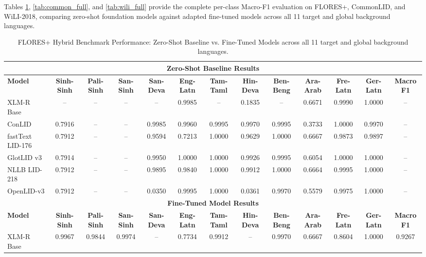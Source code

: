 \documentclass[11pt]{article}
\begin{document}
Tables \ref{tab:flores_full}, \ref{tab:common_full}, and \ref{tab:wili_full} provide the complete per-class Macro-F1 evaluation on FLORES+, CommonLID, and WiLI-2018, comparing zero-shot foundation models against adapted fine-tuned models across all 11 target and global background languages.

\begin{table}[p]
\centering
\scriptsize
\setlength{\tabcolsep}{2.2pt}
\renewcommand{\arraystretch}{0.90}
\caption{FLORES+ Hybrid Benchmark Performance: Zero-Shot Baseline vs. Fine-Tuned Models across all 11 target and global background languages.}
\label{tab:flores_full}
\begin{tabular}{l ccc cccccccc c}
\toprule
\multicolumn{13}{c}{\textbf{Zero-Shot Baseline Results}} \\
\midrule
\textbf{Model} & \textbf{Sinh-Sinh} & \textbf{Pali-Sinh} & \textbf{San-Sinh} & \textbf{San-Deva} & \textbf{Eng-Latn} & \textbf{Tam-Taml} & \textbf{Hin-Deva} & \textbf{Ben-Beng} & \textbf{Ara-Arab} & \textbf{Fre-Latn} & \textbf{Ger-Latn} & \textbf{Macro F1} \\
\midrule
XLM-R Base & -- & -- & -- & -- & 0.9985 & -- & 0.1835 & -- & 0.6671 & 0.9990 & 1.0000 & -- \\
ConLID & 0.7916 & -- & -- & 0.9985 & 0.9960 & 0.9995 & 0.9970 & 0.9995 & 0.3733 & 1.0000 & 0.9970 & -- \\
fastText LID-176 & 0.7912 & -- & -- & 0.9594 & 0.7213 & 1.0000 & 0.9629 & 1.0000 & 0.6667 & 0.9873 & 0.9897 & -- \\
GlotLID v3 & 0.7914 & -- & -- & 0.9950 & 1.0000 & 1.0000 & 0.9926 & 0.9995 & 0.6054 & 1.0000 & 1.0000 & -- \\
NLLB LID-218 & 0.7912 & -- & -- & 0.9895 & 0.9840 & 1.0000 & 0.9912 & 1.0000 & 0.6664 & 0.9995 & 1.0000 & -- \\
OpenLID-v3 & 0.7912 & -- & -- & 0.0350 & 0.9995 & 1.0000 & 0.0361 & 0.9970 & 0.5579 & 0.9975 & 1.0000 & -- \\
\midrule
\multicolumn{13}{c}{\textbf{Fine-Tuned Model Results}} \\
\midrule
\textbf{Model} & \textbf{Sinh-Sinh} & \textbf{Pali-Sinh} & \textbf{San-Sinh} & \textbf{San-Deva} & \textbf{Eng-Latn} & \textbf{Tam-Taml} & \textbf{Hin-Deva} & \textbf{Ben-Beng} & \textbf{Ara-Arab} & \textbf{Fre-Latn} & \textbf{Ger-Latn} & \textbf{Macro F1} \\
\midrule
XLM-R Base & 0.9967 & 0.9844 & 0.9974 & -- & 0.7734 & 0.9912 & -- & 0.9970 & 0.6667 & 0.8604 & 1.0000 & 0.9267 \\

\end{tabular}
\end{table}
\end{document}

